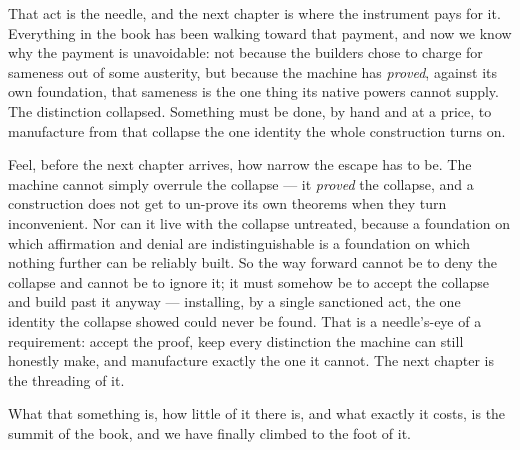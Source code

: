 That act is the needle, and the next chapter is where the instrument pays for it. Everything in the book has been
walking toward that payment, and now we know why the payment is unavoidable: not because the builders chose to
charge for sameness out of some austerity, but because the machine has \emph{proved}, against its own foundation,
that sameness is the one thing its native powers cannot supply. The distinction collapsed. Something must be done,
by hand and at a price, to manufacture from that collapse the one identity the whole construction turns on.

Feel, before the next chapter arrives, how narrow the escape has to be. The machine cannot simply overrule the
collapse --- it \emph{proved} the collapse, and a construction does not get to un-prove its own theorems when they
turn inconvenient. Nor can it live with the collapse untreated, because a foundation on which affirmation and
denial are indistinguishable is a foundation on which nothing further can be reliably built. So the way forward
cannot be to deny the collapse and cannot be to ignore it; it must somehow be to accept the collapse and build
past it anyway --- installing, by a single sanctioned act, the one identity the collapse showed could never be
found. That is a needle's-eye of a requirement: accept the proof, keep every distinction the machine can still
honestly make, and manufacture exactly the one it cannot. The next chapter is the threading of it.

What
that something is, how little of it there is, and what exactly it costs, is the summit of the book, and we have
finally climbed to the foot of it.
